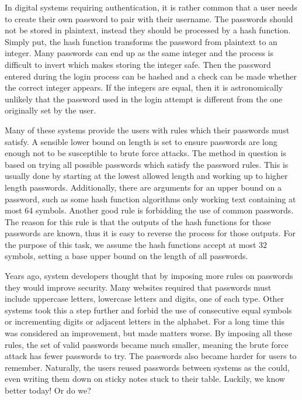 
In digital systems requiring authentication, it is rather common that a user needs to create their own password to pair with their username.
The passwords should not be stored in plaintext, instead they should be processed by a hash function.
Simply put, the hash function transforms the password from plaintext to an integer.
Many passwords can end up as the same integer and the process is difficult to invert which makes storing the integer safe.
Then the password entered during the login process can be hashed and a check can be made whether the correct integer appears.
If the integers are equal, then it is astronomically unlikely that the password used in the login attempt is different from the one originally set by the user.

Many of these systems provide the users with rules which their passwords must satisfy.
A sensible lower bound on length is set to ensure passwords are long enough not to be susceptible to brute force attacks.
The method in question is based on trying all possible passwords which satisfy the password rules.
This is usually done by starting at the lowest allowed length and working up to higher length passwords.
Additionally, there are arguments for an upper bound on a password,
such as some hash function algorithms only working text containing at most $64$ symbols.
Another good rule is forbidding the use of common passwords.
The reason for this rule is that the outputs of the hash functions for those passwords are known,
thus it is easy to reverse the process for those outputs.
For the purpose of this task, we assume the hash functions accept at most $32$ symbols,
setting a base upper bound on the length of all passwords.

Years ago, system developers thought that by imposing more rules on passwords they would improve security.
Many websites required that passwords must include uppercase letters, lowercase letters and digits, one of each type.
Other systems took this a step further and forbid the use of consecutive equal symbols or incrementing digits or adjacent letters in the alphabet.
For a long time this was considered an improvement, but made matters worse.
By imposing all these rules, the set of valid passwords became much smaller, meaning the brute force attack has fewer passwords to try.
The passwords also became harder for users to remember.
Naturally, the users reused passwords between systems as the could, even writing them down on sticky notes stuck to their table.
Luckily, we know better today! Or do we?

